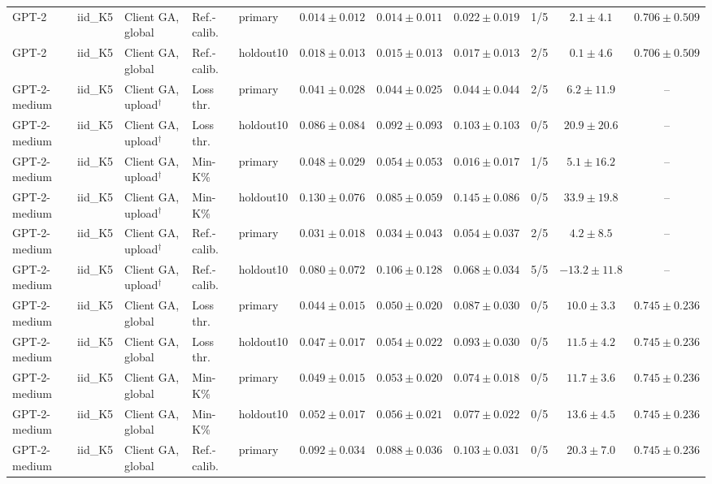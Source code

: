 {\begin{longtable}{@{\extracolsep{\fill}}lllllcccccc@{}}
GPT-2 & iid\_K5 & Client GA, global & Ref.-calib. & primary & $0.014 \pm 0.012$ & $0.014 \pm 0.011$ & $0.022 \pm 0.019$ & 1/5 & $2.1 \pm 4.1$ & $0.706 \pm 0.509$ \\
GPT-2 & iid\_K5 & Client GA, global & Ref.-calib. & holdout10 & $0.018 \pm 0.013$ & $0.015 \pm 0.013$ & $0.017 \pm 0.013$ & 2/5 & $0.1 \pm 4.6$ & $0.706 \pm 0.509$ \\
GPT-2-medium & iid\_K5 & Client GA, upload$^{\dagger}$ & Loss thr. & primary & $0.041 \pm 0.028$ & $0.044 \pm 0.025$ & $0.044 \pm 0.044$ & 2/5 & $6.2 \pm 11.9$ & -- \\
GPT-2-medium & iid\_K5 & Client GA, upload$^{\dagger}$ & Loss thr. & holdout10 & $0.086 \pm 0.084$ & $0.092 \pm 0.093$ & $0.103 \pm 0.103$ & 0/5 & $20.9 \pm 20.6$ & -- \\
GPT-2-medium & iid\_K5 & Client GA, upload$^{\dagger}$ & Min-K\% & primary & $0.048 \pm 0.029$ & $0.054 \pm 0.053$ & $0.016 \pm 0.017$ & 1/5 & $5.1 \pm 16.2$ & -- \\
GPT-2-medium & iid\_K5 & Client GA, upload$^{\dagger}$ & Min-K\% & holdout10 & $0.130 \pm 0.076$ & $0.085 \pm 0.059$ & $0.145 \pm 0.086$ & 0/5 & $33.9 \pm 19.8$ & -- \\
GPT-2-medium & iid\_K5 & Client GA, upload$^{\dagger}$ & Ref.-calib. & primary & $0.031 \pm 0.018$ & $0.034 \pm 0.043$ & $0.054 \pm 0.037$ & 2/5 & $4.2 \pm 8.5$ & -- \\
GPT-2-medium & iid\_K5 & Client GA, upload$^{\dagger}$ & Ref.-calib. & holdout10 & $0.080 \pm 0.072$ & $0.106 \pm 0.128$ & $0.068 \pm 0.034$ & 5/5 & $-13.2 \pm 11.8$ & -- \\
GPT-2-medium & iid\_K5 & Client GA, global & Loss thr. & primary & $0.044 \pm 0.015$ & $0.050 \pm 0.020$ & $0.087 \pm 0.030$ & 0/5 & $10.0 \pm 3.3$ & $0.745 \pm 0.236$ \\
GPT-2-medium & iid\_K5 & Client GA, global & Loss thr. & holdout10 & $0.047 \pm 0.017$ & $0.054 \pm 0.022$ & $0.093 \pm 0.030$ & 0/5 & $11.5 \pm 4.2$ & $0.745 \pm 0.236$ \\
GPT-2-medium & iid\_K5 & Client GA, global & Min-K\% & primary & $0.049 \pm 0.015$ & $0.053 \pm 0.020$ & $0.074 \pm 0.018$ & 0/5 & $11.7 \pm 3.6$ & $0.745 \pm 0.236$ \\
GPT-2-medium & iid\_K5 & Client GA, global & Min-K\% & holdout10 & $0.052 \pm 0.017$ & $0.056 \pm 0.021$ & $0.077 \pm 0.022$ & 0/5 & $13.6 \pm 4.5$ & $0.745 \pm 0.236$ \\
GPT-2-medium & iid\_K5 & Client GA, global & Ref.-calib. & primary & $0.092 \pm 0.034$ & $0.088 \pm 0.036$ & $0.103 \pm 0.031$ & 0/5 & $20.3 \pm 7.0$ & $0.745 \pm 0.236$ \\

\end{longtable}}
